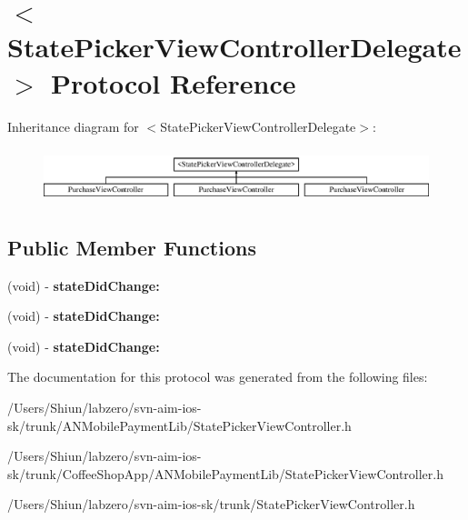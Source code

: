 \hypertarget{protocol_state_picker_view_controller_delegate-p}{
\section{$<$StatePickerViewControllerDelegate$>$ Protocol Reference}
\label{protocol_state_picker_view_controller_delegate-p}
}
Inheritance diagram for $<$StatePickerViewControllerDelegate$>$:\begin{figure}[H]
\begin{center}
\leavevmode
\includegraphics[height=1.609195cm]{protocol_state_picker_view_controller_delegate-p}
\end{center}
\end{figure}
\subsection*{Public Member Functions}
\begin{DoxyCompactItemize}
\item 
\hypertarget{protocol_state_picker_view_controller_delegate-p_a9edf714dc5aa8aa83cfb93ce2f3e45f7}{
(void) -\/ {\bfseries stateDidChange:}}
\label{protocol_state_picker_view_controller_delegate-p_a9edf714dc5aa8aa83cfb93ce2f3e45f7}

\item 
\hypertarget{protocol_state_picker_view_controller_delegate-p_a9edf714dc5aa8aa83cfb93ce2f3e45f7}{
(void) -\/ {\bfseries stateDidChange:}}
\label{protocol_state_picker_view_controller_delegate-p_a9edf714dc5aa8aa83cfb93ce2f3e45f7}

\item 
\hypertarget{protocol_state_picker_view_controller_delegate-p_a9edf714dc5aa8aa83cfb93ce2f3e45f7}{
(void) -\/ {\bfseries stateDidChange:}}
\label{protocol_state_picker_view_controller_delegate-p_a9edf714dc5aa8aa83cfb93ce2f3e45f7}

\end{DoxyCompactItemize}


The documentation for this protocol was generated from the following files:\begin{DoxyCompactItemize}
\item 
/Users/Shiun/labzero/svn-\/aim-\/ios-\/sk/trunk/ANMobilePaymentLib/StatePickerViewController.h\item 
/Users/Shiun/labzero/svn-\/aim-\/ios-\/sk/trunk/CoffeeShopApp/ANMobilePaymentLib/StatePickerViewController.h\item 
/Users/Shiun/labzero/svn-\/aim-\/ios-\/sk/trunk/StatePickerViewController.h\end{DoxyCompactItemize}

